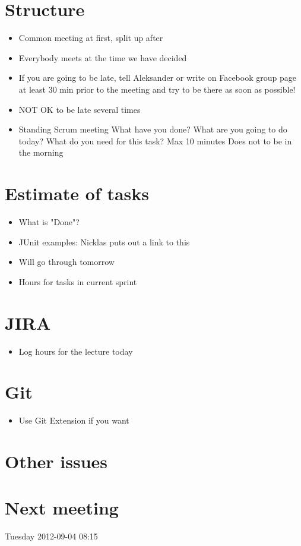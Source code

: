 \documentclass[a4paper,12pt]{article}
\begin{document}
\section{Structure}
\begin{itemize}
\item
Common meeting at first, split up after
\item
Everybody meets at the time we have decided
\item
If you are going to be late, tell Aleksander or write on Facebook group page at least 30 min prior to the meeting and try to be there as soon as possible!
\item
NOT OK to be late several times
\item
Standing Scrum meeting
\subitem
What have you done?
\subitem
What are you going to do today?
\subitem
What do you need for this task?
\subitem
Max 10 minutes
\subitem
Does not to be in the morning
\end{itemize}
\section{Estimate of tasks}
\begin{itemize}
\item
What is "Done"?
\item
JUnit examples: Nicklas puts out a link to this
\item
Will go through tomorrow
\item
Hours for tasks in current sprint
\end{itemize}
\section{JIRA}
\begin{itemize}
\item
Log hours for the lecture today
\end{itemize}
\section{Git}
\begin{itemize}
\item
Use Git Extension if you want
\end{itemize}
\section{Other issues}
\section{Next meeting}
Tuesday 2012-09-04 08:15
\end{document}
